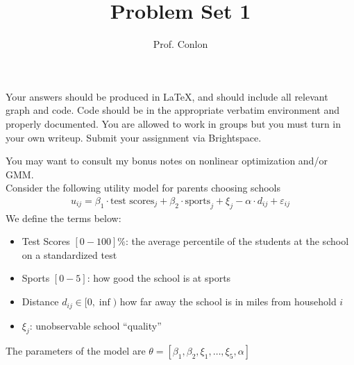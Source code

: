 \documentclass{article}
\title{Problem Set 1}
\begin{document}
\small
\date{}
\author{Prof. Conlon}
\maketitle
Your answers should be produced in \LaTeX, and should include all relevant graph and code.  Code should be in the appropriate verbatim environment and properly documented. You are allowed to work in groups but you must turn in your own writeup. Submit your assignment via Brightspace.

You may want to consult my bonus notes on nonlinear optimization and/or GMM.\\

Consider the following utility model for parents choosing schools
\begin{align*}
u_{ij} = \beta_1 \cdot \text{test scores}_j  +\beta_2 \cdot \text{sports}_j+ \xi_j - \alpha \cdot d_{ij} +  \varepsilon_{ij}
\end{align*}
We define the terms below:
\begin{itemize}
	\item Test Scores $[0-100]\%$: the average percentile of the students at the school on a standardized test
	\item Sports $[0-5]$: how good the school is at sports
	\item Distance $d_{ij} \in [0,\inf)$ how far away the school is in miles from household $i$
	\item $\xi_j$: unobservable school ``quality''
\end{itemize}
The parameters of the model are $\theta = [\beta_1,\beta_2, \xi_1,\ldots,\xi_5, \alpha]$
\end{document}
